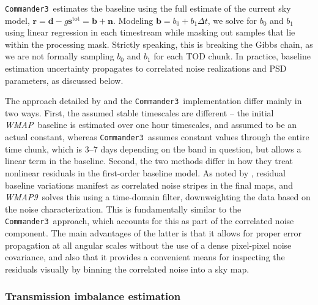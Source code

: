 \documentclass[twocolumn]{../../common/aa}
\def\WMAP{\emph{WMAP}}
\def\WMAPnine{\emph{WMAP9}}
\def\commanderthree{\texttt{Commander3}}
\begin{document}
\commanderthree\ estimates the baseline using the full estimate of the current sky
model, $\boldsymbol r=\boldsymbol d-g\boldsymbol s^\mathrm{tot}=\boldsymbol
b+\boldsymbol n$. Modeling $\boldsymbol b=b_0+b_1\Delta t$, we solve for $b_0$
and $b_1$ using linear regression in each timestream while masking out samples
that lie within the processing mask. Strictly speaking, this is breaking the
Gibbs chain, as we are not formally sampling $b_0$ and $b_1$ for each TOD
chunk. In practice, baseline estimation uncertainty propagates to correlated
noise realizations and PSD parameters, as discussed below.

The approach detailed by \citet{hinshaw2003a} and the
\commanderthree\ implementation differ mainly in two ways. First, the
assumed stable timescales are different -- the initial
\WMAP\ baseline is estimated over one hour timescales, and assumed to
be an actual constant, whereas \commanderthree\ assumes constant values
through the entire time chunk, which is 3--7 days depending on the
band in question, but allows a linear term in the baseline. Second,
the two methods differ in how they treat nonlinear residuals in the
first-order baseline model.  As noted by \citet{hinshaw2003a},
residual baseline variations manifest as correlated noise stripes in
the final maps, and \WMAPnine\ solves this using a time-domain filter,
downweighting the data based on the noise characterization. This
is fundamentally similar to the \commanderthree\ approach, which
accounts for this as part of the correlated noise component. The main
advantages of the latter is that it allows for proper error
propagation at all angular scales without the use of a dense
pixel-pixel noise covariance, and also that it provides a convenient
means for inspecting the residuals visually by binning the correlated
noise into a sky map.


\subsubsection{Transmission imbalance estimation}
\label{ssec:imbalance}
\end{document}
